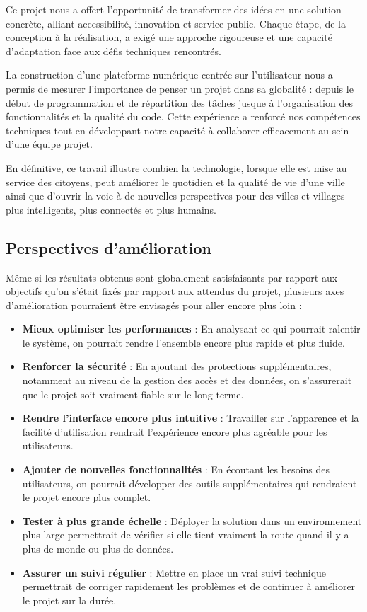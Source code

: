 \documentclass[a4paper,12pt]{report}
\begin{document}
	Ce projet nous a offert l'opportunité de transformer des idées en une solution concrète, alliant accessibilité, innovation et service public. Chaque étape, de la conception à la réalisation, a exigé une approche rigoureuse et une capacité d'adaptation face aux défis techniques rencontrés.
	
	La construction d’une plateforme numérique centrée sur l’utilisateur nous a permis de mesurer l’importance de penser un projet dans sa globalité : depuis le début de programmation et de répartition des tâches jusque à l'organisation des fonctionnalités et la qualité du code. Cette expérience a renforcé nos compétences techniques tout en développant notre capacité à collaborer efficacement au sein d'une équipe projet.
	
	En définitive, ce travail illustre combien la technologie, lorsque elle est mise au service des citoyens, peut améliorer le quotidien et la qualité de vie d'une ville ainsi que d'ouvrir la voie à de nouvelles perspectives pour des villes et villages plus intelligents, plus connectés et plus humains.
	
	\subsection{Perspectives d'amélioration}
	
	Même si les résultats obtenus sont globalement satisfaisants par rapport aux objectifs qu'on s'était fixés par rapport aux attendus du projet, plusieurs axes d'amélioration pourraient être envisagés pour aller encore plus loin :
	
	\begin{itemize}
		\item \textbf{Mieux optimiser les performances} : En analysant ce qui pourrait ralentir le système, on pourrait rendre l'ensemble encore plus rapide et plus fluide.
		
		\item \textbf{Renforcer la sécurité} : En ajoutant des protections supplémentaires, notamment au niveau de la gestion des accès et des données, on s'assurerait que le projet soit vraiment fiable sur le long terme.
		
		\item \textbf{Rendre l’interface encore plus intuitive} : Travailler sur l'apparence et la facilité d’utilisation rendrait l’expérience encore plus agréable pour les utilisateurs.
		
		\item \textbf{Ajouter de nouvelles fonctionnalités} : En écoutant les besoins des utilisateurs, on pourrait développer des outils supplémentaires qui rendraient le projet encore plus complet.
		
		\item \textbf{Tester à plus grande échelle} : Déployer la solution dans un environnement plus large permettrait de vérifier si elle tient vraiment la route quand il y a plus de monde ou plus de données.
		
		\item \textbf{Assurer un suivi régulier} : Mettre en place un vrai suivi technique permettrait de corriger rapidement les problèmes et de continuer à améliorer le projet sur la durée.
	\end{itemize}
\end{document}
